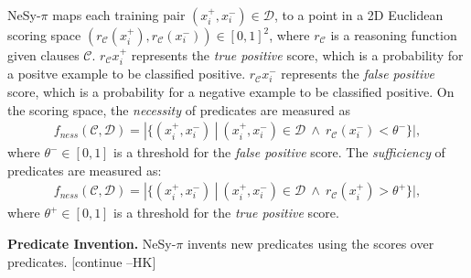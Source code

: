\documentclass[
]{ceurart}
\newcommand{\hk}[1]{\textcolor{Apricot}{[#1 \textsc{--HK}]}}
\begin{document}
	NeSy-$\pi$ maps each training pair $(x_i^+, x_i^-) \in \mathcal{D}$, to a point in a 2D Euclidean scoring space $(r_\mathcal{C}(x_i^+), r_\mathcal{C}(x_i^-)) \in [0,1]^2$, where $r_\mathcal{C}$ is a reasoning function given clauses $\mathcal{C}$.
	$r_\mathcal{C}{x_i^+}$ represents the \emph{true positive} score, which is a probability for a positve example to be classified positive.
	$r_\mathcal{C}{x_i^-}$ represents the \emph{false positive} score, which is a probability for a negative example to be classified positive.
	On the scoring space, the \emph{necessity} of predicates are measured as
	\begin{align}
		f_\mathit{ness}(\mathcal{C}, \mathcal{D}) = |\{(x_i^+, x_i^-) ~|~  (x_i^+, x_i^-) \in \mathcal{D} ~ \land ~  r_\mathcal{C}(x_i^-) < \theta^-  \}|,
	\end{align}
	where $\theta^- \in [0,1]$ is a threshold for the \emph{false positive} score.
	The \emph{sufficiency} of predicates are measured as:
	\begin{align}
		f_\mathit{ness}(\mathcal{C}, \mathcal{D}) = |\{(x_i^+, x_i^-) ~|~  (x_i^+, x_i^-) \in \mathcal{D} ~ \land ~  r_\mathcal{C}(x_i^+) > \theta^+  \}|,
	\end{align}
	where $\theta^+ \in [0,1]$ is a threshold for the \emph{true positive} score.
	
	\textbf{Predicate Invention.}
	NeSy-$\pi$ invents new predicates using the scores over predicates. \hk{continue}
	
	
	
	
	
	
\end{document}
